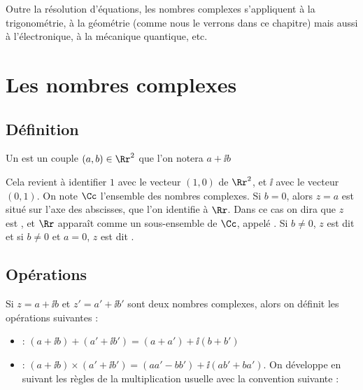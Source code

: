 \documentclass[class=report,crop=false]{standalone}
\begin{document}
\bigskip


Outre la résolution d'équations, les nombres complexes s'appliquent
à la trigonométrie, à la géométrie (comme nous le verrons dans ce chapitre)
 mais aussi à l'électronique, à la mécanique quantique, etc.


\section{Les nombres complexes}

\subsection{Définition}

\begin{definition}
  Un  est un couple $(a, b) \in \Rr^2$ que l'on notera $a + \ii b$
\vspace{-0.5em}
\end{definition}
Cela revient à identifier $1$ avec le vecteur $(1,0)$ de $\Rr^2$, et $\ii$ avec le vecteur $(0,1)$.
On note $\Cc$ l'ensemble des nombres complexes. Si $b = 0$, alors $z = a$ est situé sur l'axe des abscisses,
que l'on identifie à $\Rr$.
Dans ce cas on dira que $z$ est ,
et $\Rr$ apparaît comme un sous-ensemble de $\Cc$, appelé .
Si $b\neq 0$, $z$ est dit  et si $b \neq 0$ et $a=0$, $z$ est dit .


\subsection{Opérations}

Si $z = a + \ii b$ et $z' = a' + \ii b'$ sont deux nombres
complexes, alors on définit les opérations suivantes :
\begin{itemize}
  \item {} : $(a + \ii b) + (a' + \ii b') =
(a + a') + \ii  (b + b')$
  \item {} : $(a + \ii b) \times (a' + \ii b')
  = (aa' - bb') + \ii  (ab' + ba')$. On développe en suivant les règles de la multiplication usuelle 
  avec la convention suivante : 
\end{itemize}
\end{document}
